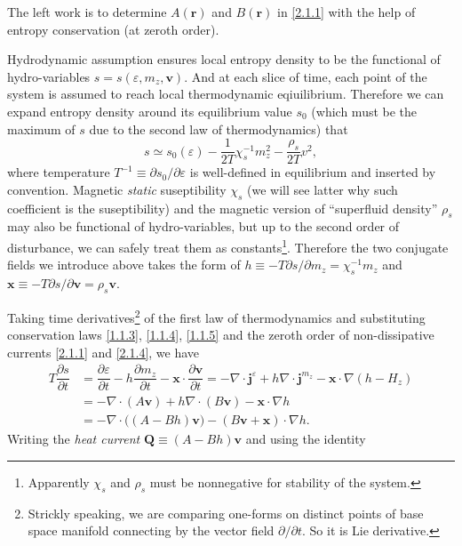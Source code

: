 \documentclass[10pt,nofootinbib,letterpaper]{revtex4}
\begin{document}
			\indent The left work is to determine $A(\bm{r})$ and $B(\bm{r})$ in \eqref{2.1.1} with the help of entropy conservation (at zeroth order).\par
			Hydrodynamic assumption ensures local entropy density to be the functional of hydro-variables $s=s(\varepsilon,m_z,\bm{v})$. And at each slice of time, each point of the system is assumed to reach local thermodynamic eqiuilibrium. Therefore we can expand entropy density around its equilibrium value $s_0$ (which must be the maximum of $s$ due to the second law of thermodynamics) that 
			\begin{equation}\label{2.1.5}
				s\simeq s_0(\varepsilon)-\dfrac{1}{2T}\chi_s^{-1}m_z^2-\dfrac{\rho_s}{2T}v^2,
			\end{equation}
			where temperature $T^{-1}\equiv\partial s_0/\partial\varepsilon$ is well-defined in equilibrium and inserted by convention. Magnetic \emph{static} suseptibility $\chi_s$ (we will see latter why such coefficient is the suseptibility) and the magnetic version of ``superfluid density'' $\rho_s$ may also be functional of hydro-variables, but up to the second order of disturbance, we can safely treat them as constants\footnote{Apparently $\chi_s$ and $\rho_s$ must be nonnegative for stability of the system.}. Therefore the two conjugate fields we introduce above takes the form of $h\equiv-T \partial s/\partial m_z=\chi_s^{-1}m_z$ and $\bm{x}\equiv-T\partial s/\partial \bm{v}=\rho_s\bm{v}$.\par
			Taking time derivatives\footnote{Strickly speaking, we are comparing one-forms on distinct points of base space manifold connecting by the vector field $\partial/\partial t$. So it is Lie derivative.} of the first law of thermodynamics and substituting conservation laws \eqref{1.1.3}, \eqref{1.1.4}, \eqref{1.1.5} and the zeroth order of non-dissipative currents \eqref{2.1.1} and \eqref{2.1.4}, we have
			\begin{align}\label{2.1.6}
				T\dfrac{\partial s}{\partial t}&=\dfrac{\partial \varepsilon}{\partial t}-h\dfrac{\partial m_z}{\partial t}-\bm{x}\cdot\dfrac{\partial \bm{v}}{\partial t}=-\nabla\cdot\bm{j}^\varepsilon+h\nabla\cdot\bm{j}^{m_z}-\bm{x}\cdot\nabla(h-H_z)\nonumber\\
				&=-\nabla\cdot(A\bm{v})+h\nabla\cdot(B\bm{v})-\bm{x}\cdot\nabla h\nonumber\\
				&=-\nabla\cdot\bigg((A-Bh)\bm{v}\bigg)-(B\bm{v}+\bm{x})\cdot\nabla h.
			\end{align}
			Writing the \emph{heat current} $\bm{Q}\equiv (A-Bh)\bm{v}$ and using the identity
\end{document}
